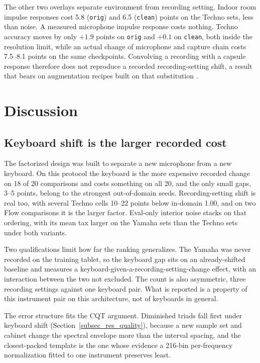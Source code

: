 \documentclass[pdflatex,sn-mathphys-num,iicol]{sn-jnl}
\begin{document}
The other two overlays separate environment from recording setting. Indoor room impulse responses cost 5.8 (\texttt{orig}) and 6.5 (\texttt{clean}) points on the Techno sets, less than noise. A measured microphone impulse response costs nothing. Techno accuracy moves by only $+1.9$ points on \texttt{orig} and $+0.1$ on \texttt{clean}, both inside the resolution limit, while an actual change of microphone and capture chain costs 7.5--8.1 points on the same checkpoints. Convolving a recording with a capsule response therefore does not reproduce a recorded recording-setting shift, a result that bears on augmentation recipes built on that substitution \cite{Kusaka2024,Edwards2024,Byambatsogt2020,Ostermann2023}.

\section{Discussion}\label{sec_discussion}

\subsection{Keyboard shift is the larger recorded cost}\label{subsec_disc_keyboard}

The factorized design was built to separate a new microphone from a new keyboard. On this protocol the keyboard is the more expensive recorded change on 18 of 20 comparisons and costs something on all 20, and the only small gaps, 3--5 points, belong to the strongest out-of-domain seeds. Recording-setting shift is real too, with several Techno cells 10--22 points below in-domain 1.00, and on two Flow comparisons it is the larger factor. Eval-only interior noise stacks on that ordering, with its mean tax larger on the Yamaha sets than the Techno sets under both variants.

Two qualifications limit how far the ranking generalizes. The Yamaha was never recorded on the training tablet, so the keyboard gap sits on an already-shifted baseline and measures a keyboard-given-a-recording-setting-change effect, with an interaction between the two not excluded. The count is also asymmetric, three recording settings against one keyboard pair. What is reported is a property of this instrument pair on this architecture, not of keyboards in general.

The error structure fits the CQT argument. Diminished triads fall first under keyboard shift (Section~\ref{subsec_res_quality}), because a new sample set and cabinet change the spectral envelope more than the interval spacing, and the closest-packed template is the one whose evidence a 216-bin per-frequency normalization fitted to one instrument preserves least.
\end{document}
